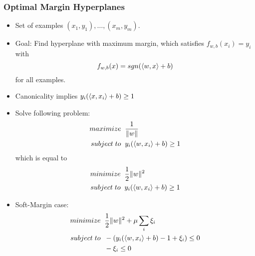 \documentclass{scrartcl}
\newcommand{\ffrac}[2]{\ensuremath{\frac{\displaystyle #1}{\displaystyle #2}}}
\DeclarePairedDelimiter\norm{\lVert}{\rVert}%
\DeclarePairedDelimiter\inner{\langle}{\rangle}%
\begin{document}
\subsubsection{Optimal Margin Hyperplanes}
\begin{itemize}
    \item
        Set of examples $(x_1, y_1), \dots, (x_m, y_m)$.
    \item
        Goal: Find hyperplane with maximum margin, which satisfies $f_{w,b}(x_i) = y_i$ with
        $$f_{w,b}(x) = sgn(\inner{w,x}+b)$$
        for all examples.
    \item
        Canonicality implies $y_i(\inner{x, x_i}+b) \geq 1$
    \item
        Solve following problem:
        \begin{align*}
            maximize \; \; & \ffrac{1}{\norm{w}}\\
            subject \; to \; \; & y_i(\inner{w, x_i}+b) \geq 1 %
        \end{align*}
        which is equal to
        \begin{align*}
            minimize \; \; & \ffrac{1}{2}\norm{w}^2\\
            subject \; to \; \; & y_i(\inner{w, x_i}+b) \geq 1 %
        \end{align*}
    \item
        Soft-Margin case:
        \begin{align*}
            minimize \; \; & \ffrac{1}{2}\norm{w}^2 + \mu \sum_i \xi_i\\
            subject \; to \; \; & -(y_i(\inner{w, x_i}+b)-1+\xi_i) \leq 0 \\%
            & -\xi_i \leq 0 \;\; %
        \end{align*}

\end{itemize}
\end{document}
